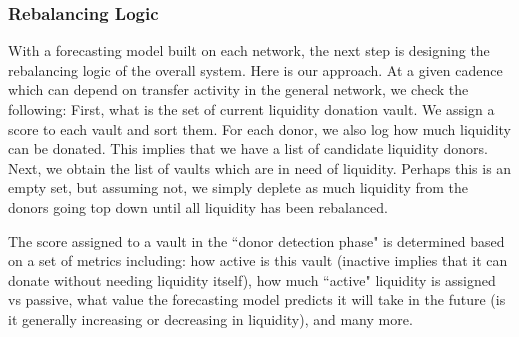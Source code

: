 \subsubsection{Rebalancing Logic}

With a forecasting model built on each network, the next step is designing the rebalancing logic of the overall system.
%
Here is our approach. At a given cadence which can depend on transfer activity in the general network, we check the following: First, what is the set of current liquidity donation vault. We assign a score to each vault and sort them. For each donor, we also log how much liquidity can be donated.
%
This implies that we have a list of candidate liquidity donors.
%
Next, we obtain the list of vaults which are in need of liquidity. Perhaps this is an empty set, but assuming not, we simply deplete as much liquidity from the donors going top down until all liquidity has been rebalanced.

The score assigned to a vault in the ``donor detection phase" is determined based on a set of metrics including: how active is this vault (inactive implies that it can donate without needing liquidity itself), how much ``active" liquidity is assigned vs passive, what value the forecasting model predicts it will take in the future (is it generally increasing or decreasing in liquidity), and many more.
